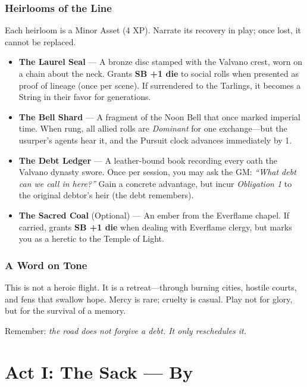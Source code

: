 \documentclass[11pt,a5paper]{book}
\newcommand{\sb}[1]{\textbf{SB #1}}
\newcommand{\condition}[1]{\textit{#1}}
\begin{document}
\subsection*{Heirlooms of the Line}

Each heirloom is a Minor Asset (4 XP). Narrate its recovery in play; once lost, it cannot be replaced.

\begin{itemize}[leftmargin=*]
\item \textbf{The Laurel Seal} --- A bronze disc stamped with the Valvano crest, worn on a chain about the neck. Grants \sb{+1 die} to social rolls when presented as proof of lineage (once per scene). If surrendered to the Tarlings, it becomes a String in their favor for generations.
\item \textbf{The Bell Shard} --- A fragment of the Noon Bell that once marked imperial time. When rung, all allied rolls are \condition{Dominant} for one exchange---but the usurper's agents hear it, and the Pursuit clock advances immediately by 1.
\item \textbf{The Debt Ledger} --- A leather-bound book recording every oath the Valvano dynasty swore. Once per session, you may ask the GM: \textit{``What debt can we call in here?''} Gain a concrete advantage, but incur \condition{Obligation 1} to the original debtor's heir (the debt remembers).
\item \textbf{The Sacred Coal} (Optional) --- An ember from the Everflame chapel. If carried, grants \sb{+1 die} when dealing with Everflame clergy, but marks you as a heretic to the Temple of Light.
\end{itemize}

\subsection*{A Word on Tone}

This is not a heroic flight. It is a retreat---through burning cities, hostile courts, and fens that swallow hope. Mercy is rare; cruelty is casual. Play not for glory, but for the survival of a memory. 

Remember: \textit{the road does not forgive a debt. It only reschedules it.}

\clearpage

\chapter{Act I: The Sack --- By \valerius}
\end{document}
